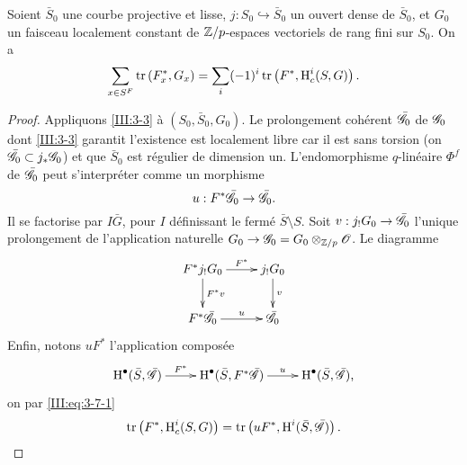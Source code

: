\begin{theorem_}\label{III:4-1bis}
Soient $\bar S_0$ une courbe projective et lisse, 
$j:S_0\hookrightarrow \bar S_0$ un ouvert dense de $\bar S_0$, et $G_0$ un 
faisceau localement constant de $\mathbb{Z}/p$-espaces vectoriels de rang fini sur 
$S_0$. On a 
\begin{equation}\label{III:eq:4-4-1}
  \sum_{x\in S^F} \operatorname{tr}\left(F_x^*,G_x\right) = \sum_i (-1)^i \operatorname{tr}\left(F^*,\operatorname{H}_c^i(S,G)\right) \text{.}
\end{equation}
\end{theorem_}
\begin{proof}
Appliquons \ref{III:3-3} \`a $(S_0,\bar S_0,G_0)$. Le prolongement coh\'erent 
$\bar{\mathscr{G}}_0$ de $\mathscr{G}_0$ dont \ref{III:3-3} garantit l'existence est localement 
libre car il est sans torsion (on  $\bar{\mathscr{G}}_0\subset j_*\mathscr{G}_0$) et que 
$\bar S_0$  est r\'egulier de dimension un. L'endomorphisme $q$-lin\'eaire 
$\Phi^f$ de $\bar{\mathscr{G}}_0$ peut s'interpr\'eter comme un morphisme 
\[
  u : F^*\bar{\mathscr{G}}_0 \to \bar{\mathscr{G}}_0 \text{.}
\]
Il se factorise par $I\bar G$, pour $I$ d\'efinissant le ferm\'e 
$\bar S\setminus S$. Soit $v:j_!G_0 \to \bar{\mathscr{G}}_0$ l'unique prolongement de 
l'application naturelle $G_0 \to \mathscr{G}_0 = G_0\otimes_{\mathbb{Z}/p}\mathscr{O}$. Le diagramme 
\begin{equation}\label{III:eq:4-4-2}
\xymatrix{
  F^* j_! G_0 \ar[r]^-{F^*} \ar[d]^-{F^* v} 
    & j_! G_0 \ar[d]^-v \\
  F^*\bar \cG_0 \ar[r]^-u 
    & \bar\cG_0
}
\end{equation}
Enfin, notons $u F^*$ l'application compos\'ee 
\[\xymatrix{
  \h^\bullet(\bar S,\bar\cG) \ar[r]^-{F^*} 
    & \h^\bullet(\bar S,F^*\bar\cG) \ar[r]^-u 
    & \h^\bullet(\bar S,\bar\cG) \text{,}
}\]
on par \eqref{III:eq:3-7-1}
\begin{equation}\label{III:eq:4-4-3}
  \operatorname{tr}\left(F^*,\operatorname{H}_c^i(S,G)\right) = \operatorname{tr}\left(u F^*,\operatorname{H}^i(\bar S,\bar{\mathscr{G}})\right) \text{.}
\end{equation}


\end{proof}

